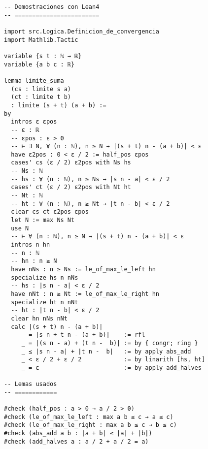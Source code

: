 \begin{verbatim}
-- Demostraciones con Lean4
-- ========================

import src.Logica.Definicion_de_convergencia
import Mathlib.Tactic

variable {s t : ℕ → ℝ}
variable {a b c : ℝ}

lemma limite_suma
  (cs : limite s a)
  (ct : limite t b)
  : limite (s + t) (a + b) :=
by
  intros ε εpos
  -- ε : ℝ
  -- εpos : ε > 0
  -- ⊢ ∃ N, ∀ (n : ℕ), n ≥ N → |(s + t) n - (a + b)| < ε
  have ε2pos : 0 < ε / 2 := half_pos εpos
  cases' cs (ε / 2) ε2pos with Ns hs
  -- Ns : ℕ
  -- hs : ∀ (n : ℕ), n ≥ Ns → |s n - a| < ε / 2
  cases' ct (ε / 2) ε2pos with Nt ht
  -- Nt : ℕ
  -- ht : ∀ (n : ℕ), n ≥ Nt → |t n - b| < ε / 2
  clear cs ct ε2pos εpos
  let N := max Ns Nt
  use N
  -- ⊢ ∀ (n : ℕ), n ≥ N → |(s + t) n - (a + b)| < ε
  intros n hn
  -- n : ℕ
  -- hn : n ≥ N
  have nNs : n ≥ Ns := le_of_max_le_left hn
  specialize hs n nNs
  -- hs : |s n - a| < ε / 2
  have nNt : n ≥ Nt := le_of_max_le_right hn
  specialize ht n nNt
  -- ht : |t n - b| < ε / 2
  clear hn nNs nNt
  calc |(s + t) n - (a + b)|
       = |s n + t n - (a + b)|    := rfl
     _ = |(s n - a) + (t n -  b)| := by { congr; ring }
     _ ≤ |s n - a| + |t n -  b|   := by apply abs_add
     _ < ε / 2 + ε / 2            := by linarith [hs, ht]
     _ = ε                        := by apply add_halves

-- Lemas usados
-- ============

#check (half_pos : a > 0 → a / 2 > 0)
#check (le_of_max_le_left : max a b ≤ c → a ≤ c)
#check (le_of_max_le_right : max a b ≤ c → b ≤ c)
#check (abs_add a b : |a + b| ≤ |a| + |b|)
#check (add_halves a : a / 2 + a / 2 = a)
\end{verbatim}

